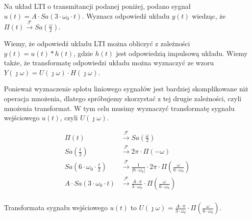 \begin{task}

Na układ LTI o transmitancji podanej poniżej, podano sygnał $u(t)=A \cdot Sa\left(3 \cdot \omega_0 \cdot t\right)$. Wyznacz odpowied\'{z} układu $y(t)$ wiedząc, że $\Pi(t) \xrightarrow{\mathcal F} Sa\left(\frac{\omega}{2}\right)$.

\begin{figure}[H]
	\centering
\end{figure}

Wiemy, że odpowied\'{z} układu LTI można obliczyć z zależności $y(t)=u(t)*h(t)$, gdzie $h(t)$ jest odpowiedzią impulsową układu. Wiemy także, że transformatę odpowiedzi układu można wyznaczyć ze wzoru $Y(\jmath \omega)=U(\jmath \omega) \cdot H(\jmath \omega)$.

Ponieważ wyznaczenie splotu liniowego sygnałów jest bardziej skomplikowane niż operacja mnożenia, dlatego spróbujemy skorzystać z tej drugie zależności, czyli mnożenia transformat. W tym celu musimy wyznaczyć transformatę sygnału wejściowego $u(t)$, czyli $U(\jmath \omega)$.


\begin{align*}
\Pi(t) &\xrightarrow{\mathcal F} Sa\left(\frac{\omega}{2}\right)\\
Sa\left(\frac{t}{2}\right)&\xrightarrow{\mathcal F} 2 \pi \cdot \Pi(-\omega)\\
Sa\left(6 \cdot \omega_0 \cdot \frac{t}{2}\right)&\xrightarrow{\mathcal F} \frac{1}{\left|6 \cdot \omega_0\right|} \cdot 2 \pi \cdot \Pi \left(\frac{\omega}{6 \cdot \omega_0}\right)\\
A \cdot Sa\left(3 \cdot \omega_0 \cdot t\right)&\xrightarrow{\mathcal F} \frac{A \cdot \pi}{3 \cdot \omega_0} \cdot \Pi \left(\frac{\omega}{6 \cdot \omega_0}\right)\\
\end{align*}

Transformata sygnału wejściowego $u(t)$ to $U(\jmath \omega)=\frac{A \cdot \pi}{3 \cdot \omega_0} \cdot \Pi \left(\frac{\omega}{6 \cdot \omega_0}\right)$.


\end{task}
